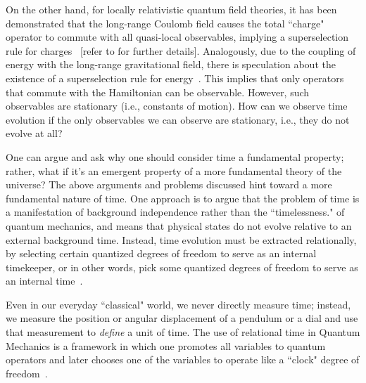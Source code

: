 On the other hand, for locally relativistic quantum field theories, it has been demonstrated that the
long-range Coulomb field causes the total ``charge" operator to commute with all quasi-local observables, 
implying a superselection rule for charges~\cite{Strocchi:1974xh} [refer to 
for further details]. Analogously, due to the coupling of energy with the long-range gravitational
field, there is speculation about the existence of a superselection rule for energy~\cite{page1983evolution}. 
This implies that only operators that commute with the Hamiltonian can be observable. However, such 
observables are stationary (i.e., constants of motion). How can we observe time evolution if the 
only observables we can observe are stationary, i.e., they do not evolve at all?

One can argue and ask why one should consider time a fundamental property; rather, what if 
it's an emergent property of a more fundamental theory of the universe? The above arguments and 
problems discussed hint toward a more fundamental nature of time. One approach is to argue that 
the problem of time is a manifestation of background independence rather than the ``timelessness." 
of quantum mechanics, and means that physical states do not evolve relative to an external background 
time. Instead, time evolution must be extracted relationally, by selecting certain quantized degrees 
of freedom to serve as an internal timekeeper, or in other words, pick some quantized degrees of freedom to serve 
as an internal time~\cite{hohn2021trinity}.

Even in our everyday ``classical" world, we never directly measure time; instead, we measure the 
position or angular displacement of a pendulum or a dial and use that measurement to \emph{define} a 
unit of time. The use of relational time in Quantum Mechanics is a framework in which one promotes 
all variables to quantum operators and later chooses one of the variables to operate like a    
``clock" degree of freedom~\cite{gambini2006relational}.

